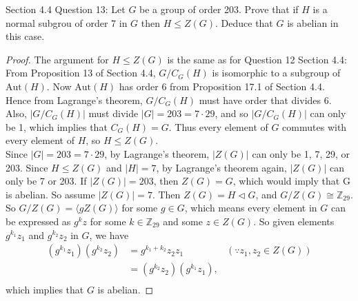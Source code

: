Section 4.4 Question 13: Let $G$ be a group of order 203. Prove that if $H$
is a normal subgrou of order 7 in $G$ then $H\leq Z(G)$. Deduce that $G$ is
abelian in this case. 

\begin{proof}
  The argument for $H\leq Z(G)$ is the same as for Question 12 Section 4.4:
  From Proposition 13 of Section 4.4, $G/C_G(H)$ is isomorphic to a
  subgroup of $\text{Aut}(H)$. Now $\text{Aut}(H)$ has order 6 from
  Proposition 17.1 of Section 4.4.  Hence from Lagrange's theorem,
  $G/C_G(H)$ must have order that divides 6. Also, $|G/C_G(H)|$ must divide
  $|G|=203=7\cdot29$, and so $|G/C_G(H)|$ can only be 1, which implies that
  $C_G(H)=G$. Thus every element of $G$ commutes with every element of $H$,
  so $H\leq Z(G)$. \\

  Since $|G|=203=7\cdot29$, by Lagrange's theorem, $|Z(G)|$ can only be 1, 7,
  29, or 203. Since $H\leq Z(G)$ and $|H|=7$, by Lagrange's theorem again,
  $|Z(G)|$ can only be 7 or 203. If $|Z(G)|=203$, then $Z(G)=G$, which
  would imply that G is abelian. So assume $|Z(G)|=7$. Then
  $Z(G)=H\triangleleft G$, and $G/Z(G)\cong\mathbb{Z}_{29}$. So
  $G/Z(G)=\langle gZ(G)\rangle$ for some $g\in G$, which means every
  element in $G$ can be expressed as $g^kz$ for some $k\in\mathbb{Z}_{29}$
  and some $z\in Z(G)$. So given elements $g^{k_1}z_1$ and $g^{k_2}z_2$ in
  $G$, we have
  \begin{align*}
    (g^{k_1}z_1)(g^{k_2}z_2)  &= g^{k_1+k_2}z_2z_1  & (\because z_1,z_2\in
      Z(G)) \\
                              &= (g^{k_2}z_2)(g^{k_1}z_1),  & \\
  \end{align*}
  which implies that $G$ is abelian.
\end{proof}

